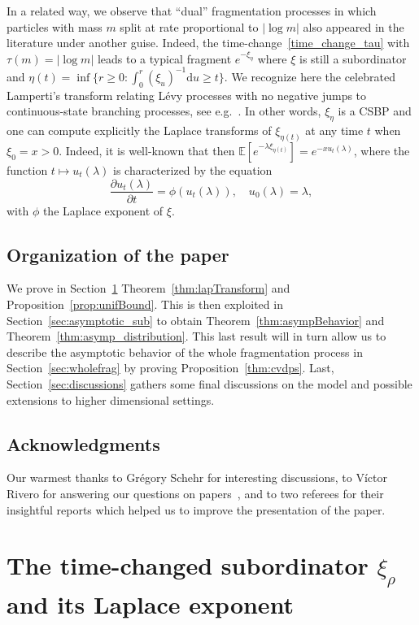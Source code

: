 \documentclass[AHL,Unicode,longabstracts,published]{cedram}
\newcommand{\bbE}{\mathbb{E}}
\newcommand{\dd}{\mathrm{d}}
\begin{document}
In a related way, we observe that ``dual'' fragmentation processes in which particles with mass $m$ split at rate proportional to $|\log m|$ also appeared in the literature under another guise. Indeed, the time-change~\eqref{time_change_tau} with $\tau(m)=|\log m|$ leads to a typical fragment $e^{-\xi_{\eta}}$ where $\xi$ is still a subordinator and $ \eta(t) = \inf \{ r \geq 0 : \int_0^r (\xi_u)^{-1} \dd u \geq t \}$. We recognize here the celebrated Lamperti's transform relating Lévy processes with no negative jumps to continuous-state branching processes, see e.g.~\cite{CLUB09,Lamp67bis}. In other words, $\xi_{\eta}$ is a CSBP and one can compute explicitly the Laplace transforms of $\xi_{\eta(t)}$ at any time $t$ when $\xi_0=x>0$. Indeed, it is well-known that then $\bbE[e^{-\lambda \xi_{\eta(t)}}]=e^{-xu_t(\lambda)}$, where the function $t \mapsto u_t(\lambda)$ is characterized by the equation
\[
\frac{\partial u_t(\lambda)}{\partial t}=\phi(u_t(\lambda)), \quad u_0(\lambda)=\lambda,
\]
with $\phi$ the Laplace exponent of $\xi$.


\subsection*{Organization of the paper}

We prove in Section~\ref{sec:Laplace} Theorem~\ref{thm:lapTransform} and Proposition~\ref{prop:unifBound}. This is then exploited in Section~\ref{sec:asymptotic_sub} to obtain Theorem~\ref{thm:asympBehavior} and Theorem~\ref{thm:asymp_distribution}. This last result will in turn allow us to describe the asymptotic behavior of the whole fragmentation process in Section~\ref{sec:wholefrag} by proving Proposition~\ref{thm:cvdps}. Last, Section~\ref{sec:discussions} gathers some final discussions on the model and possible extensions to higher dimensional settings.

\subsection*{Acknowledgments}
Our warmest thanks to Grégory Schehr for interesting discussions, to V\'ictor Rivero for answering our questions on papers~\cite{DR13,DR16_err}, and to two referees for their insightful reports which helped us to improve the presentation of the paper.

\section{The time-changed subordinator \texorpdfstring{$\xi_{\rho}$}{xiRho} and its Laplace exponent}\label{sec:Laplace}
\end{document}
